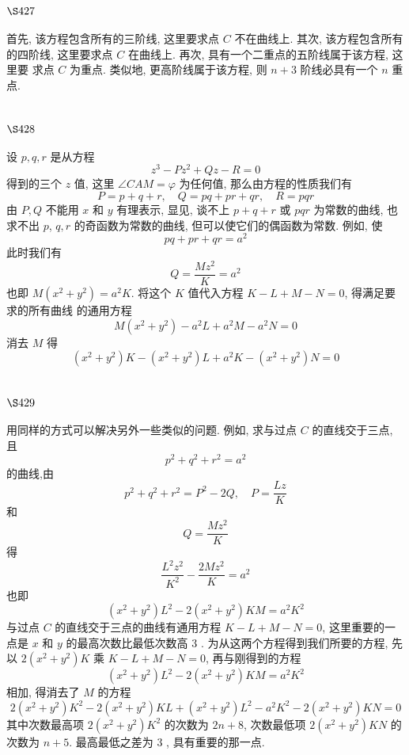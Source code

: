 \section{$\S 427$}

首先, 该方程包含所有的三阶线, 这里要求点 $C$ 不在曲线上. 其次, 该方程包含所有的四阶线, 这里要求点 $C$ 在曲线上. 再次, 具有一个二重点的五阶线属于该方程, 这里要 求点 $C$ 为重点. 类似地, 更高阶线属于该方程, 则 $n+3$ 阶线必具有一个 $n$ 重点.

\section{$\S 428$}

设 $p, q, r$ 是从方程
\[
z^{3}-P z^{2}+Q z-R=0
\]
得到的三个 $z$ 值, 这里 $\angle C A M=\varphi$ 为任何值, 那么由方程的性质我们有
\[
P=p+q+r, \quad Q=p q+p r+q r, \quad R=p q r
\]
由 $P, Q$ 不能用 $x$ 和 $y$ 有理表示, 显见, 谈不上 $p+q+r$ 或 $p q r$ 为常数的曲线, 也求不出 $p$, $q, r$ 的奇函数为常数的曲线, 但可以使它们的偶函数为常数. 例如, 使
\[
p q+p r+q r=a^{2}
\]
此时我们有
\[
Q=\frac{M z^{2}}{K}=a^{2}
\]
也即 $M\left(x^{2}+y^{2}\right)=a^{2} K$. 将这个 $K$ 值代入方程 $K-L+M-N=0$, 得满足要求的所有曲线 的通用方程
\[
M\left(x^{2}+y^{2}\right)-a^{2} L+a^{2} M-a^{2} N=0
\]
消去 $M$ 得
\[
\left(x^{2}+y^{2}\right) K-\left(x^{2}+y^{2}\right) L+a^{2} K-\left(x^{2}+y^{2}\right) N=0
\]
\section{$\S 429$}

用同样的方式可以解决另外一些类似的问题. 例如, 求与过点 $C$ 的直线交于三点, 且
\[
p^{2}+q^{2}+r^{2}=a^{2}
\]
的曲线,由
\[
p^{2}+q^{2}+r^{2}=P^{2}-2 Q, \quad P=\frac{L z}{K}
\]
和
\[
Q=\frac{M z^{2}}{K}
\]
得
\[
\frac{L^{2} z^{2}}{K^{2}}-\frac{2 M z^{2}}{K}=a^{2}
\]
也即
\[
\left(x^{2}+y^{2}\right) L^{2}-2\left(x^{2}+y^{2}\right) K M=a^{2} K^{2}
\]
与过点 $C$ 的直线交于三点的曲线有通用方程 $K-L+M-N=0$, 这里重要的一点是 $x$ 和 $y$ 的最高次数比最低次数高 3 . 为从这两个方程得到我们所要的方程, 先以 $2\left(x^{2}+y^{2}\right) K$ 乘 $K-L+M-N=0$, 再与刚得到的方程
\[
\left(x^{2}+y^{2}\right) L^{2}-2\left(x^{2}+y^{2}\right) K M=a^{2} K^{2}
\]
相加, 得消去了 $M$ 的方程
\[
2\left(x^{2}+y^{2}\right) K^{2}-2\left(x^{2}+y^{2}\right) K L+\left(x^{2}+y^{2}\right) L^{2}-a^{2} K^{2}-2\left(x^{2}+y^{2}\right) K N=0
\]
其中次数最高项 $2\left(x^{2}+y^{2}\right) K^{2}$ 的次数为 $2 n+8$, 次数最低项 $2\left(x^{2}+y^{2}\right) K N$ 的次数为 $n+5$. 最高最低之差为 3 , 具有重要的那一点.

